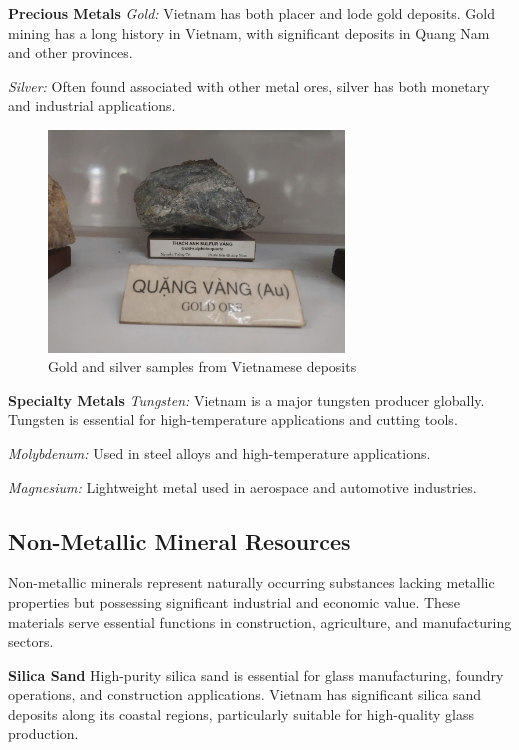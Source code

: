 \textbf{Precious Metals}
\textit{Gold:} Vietnam has both placer and lode gold deposits. Gold mining has a long history in Vietnam, with significant deposits in Quang Nam and other provinces.

\textit{Silver:} Often found associated with other metal ores, silver has both monetary and industrial applications.

\begin{figure}[H]
\centering
\includegraphics[width=0.7\textwidth]{graphics/precious_metals.png}
\caption{Gold and silver samples from Vietnamese deposits}
\label{fig:precious_metals}
\end{figure}

\textbf{Specialty Metals}
\textit{Tungsten:} Vietnam is a major tungsten producer globally. Tungsten is essential for high-temperature applications and cutting tools.

\textit{Molybdenum:} Used in steel alloys and high-temperature applications.

\textit{Magnesium:} Lightweight metal used in aerospace and automotive industries.

\subsection{Non-Metallic Mineral Resources}

Non-metallic minerals represent naturally occurring substances lacking metallic properties but possessing significant industrial and economic value. These materials serve essential functions in construction, agriculture, and manufacturing sectors.

\textbf{Silica Sand}
High-purity silica sand is essential for glass manufacturing, foundry operations, and construction applications. Vietnam has significant silica sand deposits along its coastal regions, particularly suitable for high-quality glass production.


